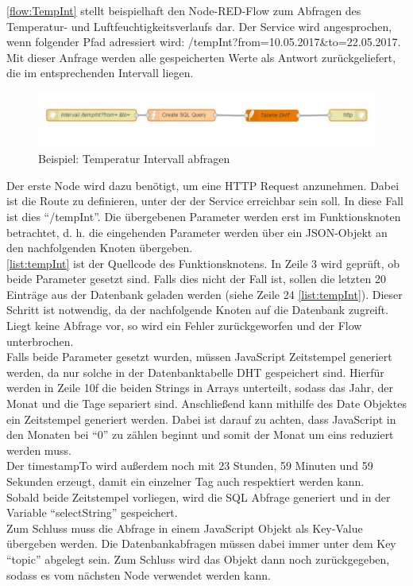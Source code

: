\autoref{flow:TempInt} stellt beispielhaft den Node-RED-Flow zum Abfragen des Temperatur- und Luftfeuchtigkeitsverlaufs dar. Der Service wird angesprochen, wenn folgender Pfad adressiert wird: /tempInt?from=10.05.2017\&to=22.05.2017. Mit dieser Anfrage werden alle gespeicherten Werte als Antwort zurückgeliefert, die im entsprechenden Intervall liegen.
\begin{figure}[h]
	\centering
	\includegraphics[scale=0.7]{images/tempIntFlow}
	\caption{Beispiel: Temperatur Intervall abfragen}
	\label{flow:TempInt}
\end{figure}
Der erste Node wird dazu benötigt, um eine HTTP Request anzunehmen. Dabei ist die Route zu definieren, unter der der Service erreichbar sein soll. In diese Fall ist dies \enquote{/tempInt}. Die übergebenen Parameter werden erst im Funktionsknoten betrachtet, d. h. die eingehenden Parameter werden über ein JSON-Objekt an den nachfolgenden Knoten übergeben. 
\\\autoref{list:tempInt} ist der Quellcode des Funktionsknotens. In Zeile 3 wird geprüft, ob beide Parameter gesetzt sind. Falls dies nicht der Fall ist, sollen die letzten 20 Einträge aus der Datenbank geladen werden (siehe Zeile 24 \autoref{list:tempInt}). Dieser Schritt ist notwendig, da der nachfolgende Knoten auf die Datenbank zugreift. Liegt keine Abfrage vor, so wird ein Fehler zurückgeworfen und der Flow  unterbrochen. 
\\Falls beide Parameter gesetzt wurden, müssen JavaScript Zeitstempel generiert werden, da nur solche in der Datenbanktabelle DHT gespeichert sind. Hierfür werden in Zeile 10f die beiden Strings in Arrays unterteilt, sodass das Jahr, der Monat und die Tage separiert sind. Anschließend kann mithilfe des Date Objektes ein Zeitstempel generiert werden. Dabei ist darauf zu achten, dass JavaScript in den Monaten bei \enquote{0} zu zählen beginnt und somit der Monat um eins reduziert werden muss. \\Der timestampTo wird außerdem noch mit 23 Stunden, 59 Minuten und 59 Sekunden erzeugt, damit ein einzelner Tag auch respektiert werden kann. \\Sobald beide Zeitstempel vorliegen, wird die \ac{SQL} Abfrage generiert und in der Variable \enquote{selectString} gespeichert. \\Zum Schluss muss die Abfrage in einem JavaScript Objekt als Key-Value übergeben werden. Die Datenbankabfragen müssen dabei immer unter dem Key \enquote{topic} abgelegt sein. Zum Schluss wird das Objekt dann noch zurückgegeben, sodass es vom nächsten Node verwendet werden kann. 
